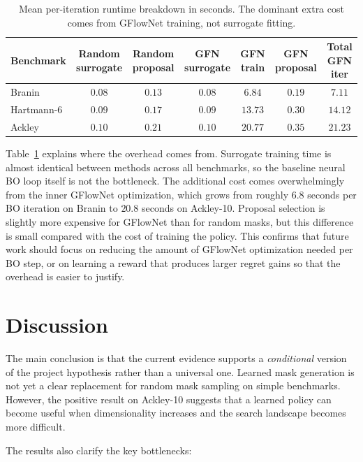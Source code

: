 \documentclass{article}
\begin{document}
\begin{table}[t]
\centering
\caption{Mean per-iteration runtime breakdown in seconds. The dominant extra cost comes from GFlowNet training, not surrogate fitting.}
\label{tab:runtime_breakdown}
\small
\begin{tabular}{lcccccc}
\toprule
Benchmark & Random surrogate & Random proposal & GFN surrogate & GFN train & GFN proposal & Total GFN iter \\
\midrule
Branin & $0.08$ & $0.13$ & $0.08$ & $6.84$ & $0.19$ & $7.11$ \\
Hartmann-6 & $0.09$ & $0.17$ & $0.09$ & $13.73$ & $0.30$ & $14.12$ \\
Ackley & $0.10$ & $0.21$ & $0.10$ & $20.77$ & $0.35$ & $21.23$ \\
\bottomrule
\end{tabular}
\end{table}

Table~\ref{tab:runtime_breakdown} explains where the overhead comes from. Surrogate training time is almost identical between methods across all benchmarks, so the baseline neural BO loop itself is not the bottleneck. The additional cost comes overwhelmingly from the inner GFlowNet optimization, which grows from roughly $6.8$ seconds per BO iteration on Branin to $20.8$ seconds on Ackley-10. Proposal selection is slightly more expensive for GFlowNet than for random masks, but this difference is small compared with the cost of training the policy. This confirms that future work should focus on reducing the amount of GFlowNet optimization needed per BO step, or on learning a reward that produces larger regret gains so that the overhead is easier to justify.

\section{Discussion}

The main conclusion is that the current evidence supports a \emph{conditional} version of the project hypothesis rather than a universal one. Learned mask generation is not yet a clear replacement for random mask sampling on simple benchmarks. However, the positive result on Ackley-10 suggests that a learned policy can become useful when dimensionality increases and the search landscape becomes more difficult.

The results also clarify the key bottlenecks:
\end{document}
